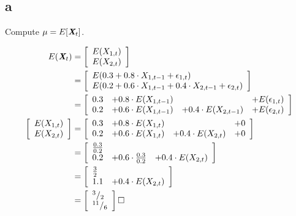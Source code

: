 \subsection{a} 
\label{section_1_a}
Compute $\mu = E[\textbf{\em X}_t]$.

\begin{solution}

\begin{equation}
\begin{aligned}
E(\textbf{\em X}_t) & =\left[\begin{array}{c} E(X_{1,t}) \\ E(X_{2,t}) \end{array}\right] \\
								& =\left[\begin{array}{l} E(0.3 + 0.8 \cdot X_{1,t-1} + \epsilon_{1,t}) \\
																	        E(0.2 + 0.6 \cdot X_{1,t-1} + 0.4 \cdot X_{2,t-1} + \epsilon_{2,t}) 
											   \end{array}\right] \\
								& =\left[\begin{array}{llll} 0.3 &+ 0.8 \cdot E(X_{1,t-1}) & &+ E(\epsilon_{1,t}) \\
																	          0.2 &+ 0.6 \cdot E(X_{1,t-1}) &+ 0.4 \cdot E(X_{2,t-1}) &+ E(\epsilon_{2,t}) 
											   \end{array}\right] \\
\left[\begin{array}{c} E(X_{1,t}) \\
											 E(X_{2,t}) 
			\end{array}\right]
								& =\left[\begin{array}{llll} 0.3 &+ 0.8 \cdot E(X_{1,t}) & &+ 0 \\
																	           0.2 &+ 0.6 \cdot E(X_{1,t}) &+ 0.4 \cdot E(X_{2,t}) &+ 0
											   \end{array}\right] \\
								& =\left[\begin{array}{lll} \frac{0.3}{0.2} & &  \\
																	           0.2 &+ 0.6 \cdot \frac{0.3}{0.2} &+ 0.4 \cdot E(X_{2,t})
											   \end{array}\right] \\
								& =\left[\begin{array}{ll} \frac{3}{2} &  \\
																	           1.1 &+ 0.4 \cdot E(X_{2,t})
											   \end{array}\right] \\
								& =\left[\begin{array}{l} ^3/_2  \\
																	        ^{11}/_6
											   \end{array}\right] \square
\end{aligned}
\end{equation}

\end{solution}